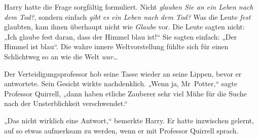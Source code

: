 Harry hatte die Frage sorgfältig formuliert. Nicht \emph{glauben Sie an ein Leben nach dem Tod?}, sondern einfach \emph{gibt es ein Leben nach dem Tod?} Was die Leute \emph{fest} glaubten, kam ihnen überhaupt nicht wie \emph{Glaube} vor. Die Leute sagten nicht: „Ich glaube fest daran, dass der Himmel blau ist!“ Sie sagten einfach: „Der Himmel ist blau“. Die wahre innere Weltvorstellung fühlte sich für einen Schlichtweg so an wie die Welt \emph{war}…

Der Verteidigungsprofessor hob seine Tasse wieder an seine Lippen, bevor er antwortete. Sein Gesicht wirkte nachdenklich. „Wenn ja, Mr~Potter,“ sagte Professor Quirrell, „dann haben etliche Zauberer sehr viel Mühe für die Suche nach der Unsterblichkeit verschwendet.“

„Das nicht wirklich eine Antwort,“ bemerkte Harry. Er hatte inzwischen gelernt, auf so etwas aufmerksam zu werden, wenn er mit Professor Quirrell sprach.

